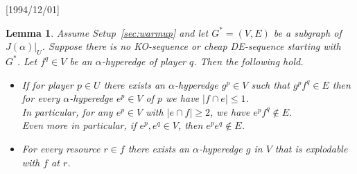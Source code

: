 \NeedsTeXFormat{LaTeX2e}[1994/12/01]\documentclass[letterpaper, 11pt]{article}
\newtheorem{lem}[thm]{Lemma}
\theoremstyle{definition}
\theoremstyle{remark}
\numberwithin{equation}{section}
\begin{document}
\begin{lem}\label{lem:simple}
  Assume Setup~\ref{sec:warmup} and let 
$G^* = (V, E)$ be a subgraph of $J(\alpha)|_U$. Suppose there is no
KO-sequence or cheap DE-sequence starting with $G^*$.
  Let $f^q\in V$ be an $\alpha$-hyperedge of
  player $q$. Then the following hold.
  \begin{itemize}
  \item[(i)]
    If for player $p\in U$ there exists an
    $\alpha$-hyperedge $g^p \in V$ such that $g^pf^q\in E$
    then for every $\alpha$-hyperedge $e^p \in V$ of $p$ we have $|f\cap e| \leq 1$.\\
In particular, for any $e^p \in V$ with
    $|e\cap f| \geq 2$, we have $e^pf^q\not\in E$. \\
    Even more in particular, if $e^p, e^q \in V$, then $e^pe^q \not\in
    E$.
    \item[(ii)]  For every resource $r \in f$
      there exists an $\alpha$-hyperedge $g$ in $V$ that is explodable with $f$ at $r$.
\end{itemize}
 \end{lem}
\end{document}
